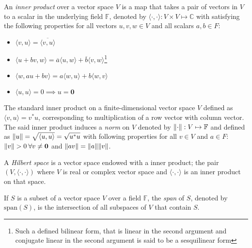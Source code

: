 \newpage

\begin{defns}
    An \emph{inner product} over a vector space $V$ is a map that takes a pair of vectors in $V$ to a scalar in the underlying field $\mathbb{F}$, denoted by $\langle \cdot, \cdot \rangle: V \times V \mapsto \mathbb{C}$ with satisfying the following properties for all vectors $u,v,w \in V$ and all scalars $a,b \in F$:
    \begin{itemize}
        \item $\langle v , u\rangle = \overline{\langle v, u\rangle}$
        \item $\langle u + b v, w\rangle = \overline{a} \langle u, w\rangle +
            \overline{b} \langle v, w \rangle$\footnote{Such a defined bilinear form, that is linear in the second argument and conjugate linear in the second argument is said to be a sesquilinear form}

        \item $\langle w, a u + b v\rangle = a \langle w, u\rangle + b \langle w, v \rangle$
        \item $\langle u, u\rangle = 0 \implies u = \mathbf{0}$
    \end{itemize}
\end{defns}

\begin{defns}[Norm]
    The standard inner product on a finite-dimensional vector space $V$ defined as $\langle v, u \rangle = v^*u$, corresponding to multiplication of a row vector with column vector. The said inner product induces a \emph{norm} on $V$ denoted by $\norm{\cdot} : V \mapsto \mathbb{F}$ and defined as $\norm{u} = \sqrt{\langle u, u \rangle} = \sqrt{u^*u}$  with following properties for all $v \in V$ and $a \in F$: $\norm{v} > 0 \>\forall v \neq \mathbf{0}$ and $\norm{a v} = \norm{a} \norm{v}$.
\end{defns}

\begin{defns}
    A \emph{Hilbert space} is a vector space endowed with a inner product; the pair $(V, \langle \cdot, \cdot \rangle)$ where $V$ is real or complex vector space and $\langle \cdot, \cdot \rangle$ is an inner product on that space.
\end{defns}

\begin{defns}[Span]
    If $S$ is a subset of a vector space $V$ over a field $\mathbb{F}$, the \emph{span} of $S$, denoted by $\mathrm{span}(S)$, is the intersection of all
subspaces of $V$ that contain $S$.
\end{defns}

